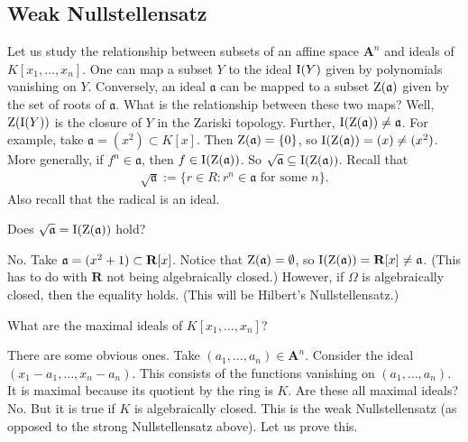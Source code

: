 \documentclass[11pt, oneside,margin=1in]{article}
\begin{document}
\subsection{Weak Nullstellensatz}

Let us study the relationship between subsets of an affine space $\mathbf{A}^n$ and ideals of $K[x_1,\hdots, x_n]$. One can map a subset $Y$ to the ideal $\operatorname{I}(Y)$ given by polynomials vanishing on $Y$. Conversely, an ideal $\mathfrak{a}$ can be mapped to a subset $\operatorname{Z}(\mathfrak a)$ given by the set of roots of $\mathfrak{a}$. What is the relationship between these two maps? Well, $\operatorname{Z}(\operatorname{I}(Y))$ is the closure of $Y$ in the Zariski topology. Further, $\operatorname{I}(\operatorname{Z}(\mathfrak{a}))\ne \mathfrak{a}$. For example, take $\mathfrak{a}=(x^2)\subset K[x]$. Then $\operatorname{Z}(\mathfrak{a}) = \{0\}$, so $\operatorname{I}(\operatorname{Z}(\mathfrak{a})) =(x)\ne (x^2)$. More generally, if $f^n\in \mathfrak{a}$, then $f\in \operatorname{I}(\operatorname{Z}(\mathfrak a))$. So $\sqrt{\mathfrak{a}} \subseteq \operatorname{I}(\operatorname{Z}(\mathfrak{a}))$. Recall that
\begin{align*}
	\sqrt{\mathfrak{a}} := \{ r\in R : r^n \in \mathfrak{a} \textrm{ for some $n$}\}.
\end{align*}
Also recall that the radical is an ideal.

\begin{problem}
	Does $\sqrt{\mathfrak{a}}= \operatorname{I}(\operatorname{Z}(\mathfrak{a})) $ hold?
\end{problem}

No. Take $\mathfrak{a} = (x^2 + 1) \subset \mathbf R[x]$. Notice that $\operatorname{Z}(\mathfrak{a})= \emptyset$, so $\operatorname{I}(\operatorname{Z}(\mathfrak{a})) = \mathbf{R}[x]\ne \mathfrak{a}$. (This has to do with $\mathbf{R}$ not being algebraically closed.) However, if $\Omega$ is algebraically closed, then the equality holds. (This will be Hilbert's Nullstellensatz.) 

\begin{problem}
	What are the maximal ideals of $K[x_1,\hdots, x_n]$?
\end{problem}

There are some obvious ones. Take $(a_1,\hdots, a_n)\in \mathbf{A}^n$. Consider the ideal $(x_1-a_1,\hdots, x_n-a_n)$. This consists of the functions vanishing on $(a_1,\hdots, a_n)$. It is maximal because its quotient by the ring is $K$. Are these all maximal ideals? No. But it is true if $K$ is algebraically closed. This is the weak Nullstellensatz  (as opposed to the strong Nullstellensatz above). Let us prove this.
\end{document}
